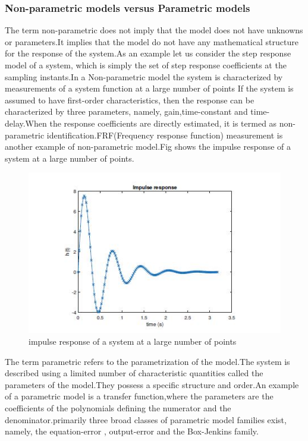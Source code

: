 \documentclass[a4paper,12pt]{article}
\numberwithin{equation}{section}
\begin{document}
\subsubsection*{ Non-parametric models versus Parametric models }
The term non-parametric does not imply that the model does not have unknowns or parameters.It implies that the model do not have any mathematical structure for the response of the system.As an example let us consider the step response model of a system, which is simply the set of step response coefficients at the sampling instants.In a Non-parametric model the system is characterized by measurements of a system function at a large number of points If the system is assumed to have first-order characteristics, then the response can be characterized by three parameters, namely, gain,time-constant and time-delay.When the response coefficients are directly estimated, it is termed as non-parametric identification.FRF(Frequency response function) measurement is another example of non-parametric model.Fig shows the impulse response of a system at a large number of points.

\begin{figure}[H]
    \includegraphics[scale=1]{impulse_response.JPG}
    \centering
    \caption{impulse response of a system at a large number of points}
    \label{fig:imp_res}
\end{figure}


The term parametric refers to the parametrization of the model.The system is described using a limited number of characteristic quantities called the parameters of the model.They possess a  specific structure and order.An example of a parametric model is a transfer function,where the parameters are the coefficients of the polynomials defining the numerator and the denominator.primarily three broad classes of parametric model families exist,
namely, the equation-error , output-error and the Box-Jenkins family.
\end{document}
